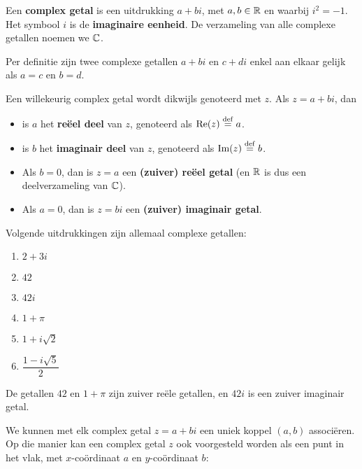 \documentclass{ximera}
\begin{document}
\begin{definition}\nl
	
Een \textbf{complex getal} is een uitdrukking $a+bi$, met $a,b \in \mathbb{R}$ en waarbij $i^2=-1$. Het symbool $i$ is de \textbf{imaginaire eenheid}. De verzameling van alle complexe getallen noemen we $\mathbb{C}$.

Per definitie zijn twee complexe getallen $a+bi$ en $c+di$ enkel aan elkaar gelijk als $a=c$ en $b=d$.

Een willekeurig complex getal wordt dikwijls genoteerd met $z$. Als $z=a+bi$, dan
\begin{itemize}
\item is $a$ het \textbf{reëel deel} van $z$, genoteerd als $\text{Re}(z) \overset{\mathrm{def}}{=} a$.
\item is $b$ het \textbf{imaginair deel} van $z$, genoteerd als $\text{Im}(z)\overset{\mathrm{def}}{=} b$.
\item Als $b=0$, dan is $z=a$ een \textbf{(zuiver) re\"eel getal} (en $\mathbb{R}$ is dus een deelverzameling van $\mathbb{C}$).
\item Als $a=0$, dan is $z=bi$ een \textbf{(zuiver) imaginair getal}. 
\end{itemize}
\end{definition}

\begin{example} Volgende uitdrukkingen zijn allemaal complexe getallen:
\begin{xmmulticols}[3]
\begin{enumerate}
\item $2+3i$ 				    %
\item $42$   				    %
\item $42i$  				    %
\item $1+\pi$				    %
\item $1+i\sqrt{2}$ 		    %
\item $\dfrac{1-i\sqrt{5}}{2}$  %
\end{enumerate}
\end{xmmulticols}
De getallen $42$ en $1+\pi$ zijn zuiver reële getallen, en $42i$ is een zuiver imaginair getal. 
\end{example}

\nl

We kunnen met elk complex getal $z=a+bi$ een uniek koppel $(a,b)$ associëren. Op die manier kan een complex getal $z$ ook voorgesteld worden als een punt in het vlak, met $x$-coördinaat $a$ en $y$-coördinaat $b$:
\end{document}

